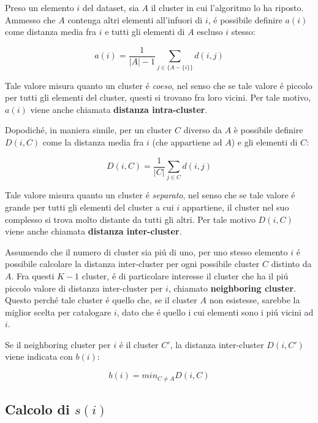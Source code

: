 \documentclass[italian]{article}
\begin{document}
		Preso un elemento $i$ del dataset, sia $A$ il cluster in cui l'algoritmo
		lo ha riposto. Ammesso che $A$ contenga altri elementi all'infuori di $i$,
		é possibile definire $a(i)$ come distanza media fra $i$ e tutti gli elementi
		di $A$ escluso $i$ stesso:

		\begin{equation}
			a(i) = \frac{1}{|A| - 1} \sum_{j \in \{A - \{i\}\}} d(i, j)
		\end{equation}

		Tale valore misura quanto un cluster é \textit{coeso}, nel senso
		che se tale valore é piccolo per tutti gli elementi del cluster,
		questi si trovano fra loro vicini. Per tale motivo, $a(i)$ viene
		anche chiamata \textbf{distanza intra-cluster}.

		Dopodiché, in maniera simile, per un cluster $C$ diverso da $A$
		è possibile definire $D(i, C)$ come la distanza media fra $i$
		(che appartiene ad $A$) e gli elementi di $C$:

		\begin{equation*}
			D(i, C) = \frac{1}{|C|} \sum_{j \in C} d(i, j)
		\end{equation*}

		Tale valore misura quanto un cluster é \textit{separato}, nel senso
		che se tale valore é grande per tutti gli elementi del cluster a cui
		$i$ appartiene, il cluster nel suo complesso si trova molto distante
		da tutti gli altri. Per tale motivo $D(i, C)$ viene anche chiamata
		\textbf{distanza inter-cluster}.

		Assumendo che il numero di cluster sia piú di uno, per uno stesso elemento
		$i$ é possibile calcolare la distanza inter-cluster per ogni possibile
		cluster $C$ distinto da $A$. Fra questi $K - 1$ cluster, é di particolare
		interesse il cluster che ha il piú piccolo valore di distanza inter-cluster
		per $i$, chiamato \textbf{neighboring cluster}. Questo perché tale cluster
		é quello che, se il cluster $A$ non esistesse, sarebbe la miglior scelta
		per catalogare $i$, dato che é quello i cui elementi sono i piú vicini ad
		$i$.

		Se il neighboring cluster per $i$ é il cluster $C'$, la distanza
		inter-cluster $D(i, C')$ viene indicata con $b(i)$:

		\begin{equation}
			b(i) = min_{C \neq A} D(i, C)
		\end{equation}

	\subsection{Calcolo di $s(i)$}
\end{document}
